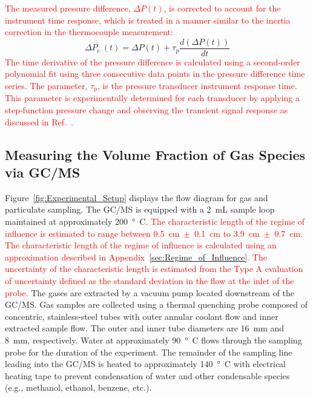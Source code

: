 \documentclass[12pt]{article}
\begin{document}
\textcolor{red}{The measured pressure difference, $\Delta P(t)$, is corrected to account for the instrument time response, which is treated in a manner similar to the inertia correction in the thermocouple measurement:}
\begin{equation}\label{eq:Delta_Pc}
\Delta P_c~(t) = \Delta P(t)+\tau_{p}\frac{d(\Delta P(t))}{dt}
\end{equation}
\textcolor{red}{The time derivative of the pressure difference is calculated using a second-order polynomial fit using three consecutive data points in the pressure difference time series. The parameter, $\tau_p$, is the pressure transducer instrument response time. This parameter is experimentally determined for each transducer by applying a step-function pressure change and observing the transient signal response as discussed in Ref.~\cite{Sung2021}}.

\subsection{Measuring the Volume Fraction of Gas Species via GC/MS}
\label{ssec:Gas_Species_Setup}

Figure~\ref{fig:Experimental_Setup} displays the flow diagram for gas and particulate sampling. The GC/MS is equipped with a 2~mL sample loop maintained at approximately \SI{200}{\degree C}. \textcolor{red}{The characteristic length of the regime of influence is estimated to range between 0.5~cm~$\pm$~0.1~cm to 3.9~cm~$\pm$~0.7~cm. The characteristic length of the regime of influence is calculated using an approximation described in Appendix~\ref{sec:Regime_of_Influence}. The uncertainty of the characteristic length is estimated from the Type A evaluation of uncertainty defined as the standard deviation in the flow at the inlet of the probe.} The gases are extracted by a vacuum pump located downstream of the GC/MS. Gas samples are collected using a thermal quenching probe composed of concentric, stainless-steel tubes with outer annular coolant flow and inner extracted sample flow. The outer and inner tube diameters are \SI{16}{mm} and \SI{8}{mm}, respectively. Water at approximately \SI{90}{\degree C} flows through the sampling probe for the duration of the experiment. The remainder of the sampling line leading into the GC/MS is heated to approximately \SI{140}{\degree C} with electrical heating tape to prevent condensation of water and other condensable species (e.g., methanol, ethanol, benzene, etc.).
\end{document}
